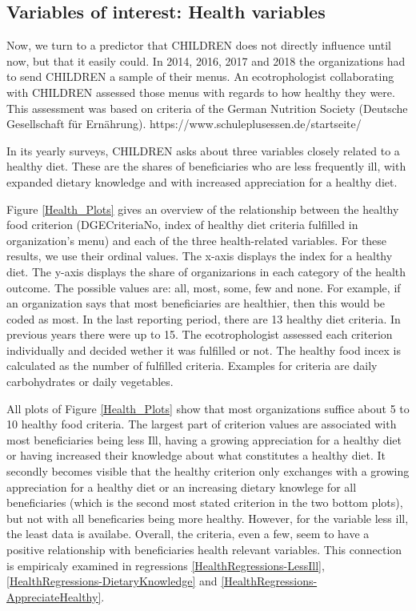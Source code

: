 \documentclass[12pt, a4paper, titlepage]{article}\usepackage[]{graphicx}\usepackage[]{color}
\begin{document}
\subsection{Variables of interest: Health variables} 

Now, we turn to a predictor that CHILDREN does not directly influence until now, but that it easily could. In 2014, 2016, 2017 and 2018 the organizations had to send CHILDREN a sample of their menus. An ecotrophologist collaborating with CHILDREN assessed those menus with regards to how healthy they were. This assessment was based on criteria of the German Nutrition Society (Deutsche Gesellschaft für Ernährung). https://www.schuleplusessen.de/startseite/

In its yearly surveys, CHILDREN asks about three variables closely related to a healthy diet. These are the shares of beneficiaries who are less frequently ill, with expanded dietary knowledge and with increased appreciation for a healthy diet. 

Figure \ref{Health_Plots} gives an overview of the relationship between the healthy food criterion (DGECriteriaNo, index of healthy diet criteria fulfilled in organization's menu) and each of the three health-related variables. For these results, we use their ordinal values. The x-axis displays the index for a healthy diet. The y-axis displays the share of organizarions in each category of the health outcome. The possible values are: all, most, some, few and none. For example, if an organization says that most beneficiaries are healthier, then this would be coded as most. In the last reporting period, there are 13 healthy diet criteria. In previous years there were up to 15. The ecotrophologist assessed each criterion individually and decided wether it was fulfilled or not. The healthy food incex is calculated as the number of fulfilled criteria. Examples for criteria are daily carbohydrates or daily vegetables.  

All plots of Figure \ref{Health_Plots} show that most organizations suffice about 5 to 10 healthy food criteria. The largest part of criterion values are associated with most beneficiaries being less Ill, having a growing appreciation for a healthy diet or having increased their knowledge about what constitutes a healthy diet. It secondly becomes visible that the healthy criterion only exchanges with a growing appreciation for a healthy diet or an increasing dietary knowlege for all beneficiaries (which is the second most stated criterion in the two bottom plots), but not with all beneficaries being more healthy. However, for the variable less ill, the least data is availabe. Overall, the criteria, even a few, seem to have a positive relationship with beneficiaries health relevant variables. This connection is empiricaly examined in regressions \ref{HealthRegressions-LessIll}, \ref{HealthRegressions-DietaryKnowledge} and \ref{HealthRegressions-AppreciateHealthy}.
\end{document}
